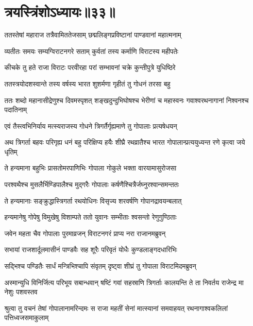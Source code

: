 \chapter{त्रयस्त्रिंशोऽध्यायः॥३३॥}

\twolineshloka
{ततस्तेषां महाराज तत्रैवामिततेजसाम्}
{छद्मलिङ्गप्रविष्टानां पाण्डवानां महात्मनाम्}


\twolineshloka
{व्यतीतः समयः सम्यग्विराटनगरे सताम्}
{कुर्वतां तस्य कर्माणि विराटस्य महीपतेः}


\twolineshloka
{कीचके तु हते राजा विराटः परवीरहा}
{परां सम्भावनां चक्रे कुन्तीपुत्रे युधिष्ठिरे}


\twolineshloka
{ततस्त्रयोदशस्वान्ते तस्य वर्षस्य भारत}
{शुशर्मणा गृहीतं तु गोधनं तरसा बहु}


\threelineshloka
{ततः शब्दो महानासीद्रेणुश्च दिवमस्पृशत्}
{शङ्खदुन्दुभिघोषश्च भेरीणां च महास्वनः}
{गवाश्वरथनागानां निश्वनश्च पदातिनाम्}


\twolineshloka
{एवं तैस्त्वभिनिर्याय मत्स्यराजस्य गोधने}
{त्रिगर्तैर्गृह्यमाणे तु गोपालाः प्रत्यषेधयन्}


\threelineshloka
{अथ त्रिगर्ता बहवः परिगृह्य धनं बहु}
{परिक्षिप्य हयैः शीघ्रै रथव्रातैश्च भारत}
{गोपालान्प्रत्ययुध्यन्त रणे कृत्वा जये धृतिम्}


\twolineshloka
{ते हन्यमाना बहुभिः प्रासतोमरपाणिभिः}
{गोपाला गोकुले भक्ता वारयामासुरोजसा}


\twolineshloka
{परश्वथैश्च मुसलैर्भिण्डिपालैश्च मुद्गरैः}
{गोपालाः कर्षणैश्चित्रैर्जघ्नुरश्वान्समन्ततः}


\twolineshloka
{ते हन्यमानाः सङ्क्रुद्धास्त्रिगर्ता रथयोधिनः}
{विसृज्य शरवर्षणि गोपानद्रावयन्बलात्}


\twolineshloka
{हन्यमानेषु गोपेषु विमुखेषु विशाम्पते}
{ततो युवानः सम्भीताः श्वसन्तो रेणुगुण्ठिताः}


\twolineshloka
{जवेन महता चैव गोपालाः पुरमाव्रजन्}
{विराटनगरं प्राप्य नरा राजानमब्रुवन्}


\twolineshloka
{सभायां राजशार्दूलमासीनं पाण्डवैः सह}
{शूरैः परिवृतं योधैः कुण्डलाङ्गदधारिभिः}


\twolineshloka
{सद्भिश्च पण्डितैः सार्धं मन्त्रिभिश्चापि संवृतम्}
{दृष्ट्वा शीघ्रं तु गोपाला विराटमिदमब्रुवन्}


\threelineshloka
{अस्मान्युधि विनिर्जित्य परिभूय सबान्धवान्}
{षष्टिं गवां सहस्राणि त्रिगर्ताः कालयन्ति ते}
{ता निवर्तय राजेन्द्र मा नेशुः पशवस्तव}



\threelineshloka
{श्रुत्वा तु वचनं तेषां गोपालानामरिन्दमः}
{स राजा महतीं सेनां मात्स्यानां समवाहयत्}
{रथनागाश्वकलिलां पत्तिध्वजसमाकुलाम्}


